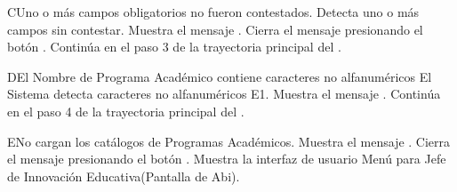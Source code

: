 
\begin{UCtrayectoriaA}{C}{Uno o más campos obligatorios no fueron contestados.}
	\UCpaso Detecta uno o más campos sin contestar.
    \UCpaso Muestra el mensaje .
    \UCpaso[\UCactor] Cierra el mensaje presionando el botón .
    \UCpaso Continúa en el paso 3 de la trayectoria principal del .
\end{UCtrayectoriaA}

\begin{UCtrayectoriaA}{D}{El Nombre de Programa Académico contiene caracteres no alfanuméricos}
	\UCpaso El Sistema detecta caracteres no alfanuméricos E1.
    \UCpaso Muestra el mensaje .
    \UCpaso Continúa en el paso 4 de la trayectoria principal del .
\end{UCtrayectoriaA}

\begin{UCtrayectoriaA}{E}{No cargan los catálogos de Programas Académicos.}
    \UCpaso Muestra el mensaje .
    \UCpaso[\UCactor] Cierra el mensaje presionando el botón .
\UCpaso Muestra la interfaz de usuario Menú para Jefe de Innovación Educativa(Pantalla de Abi).
\end{UCtrayectoriaA}
